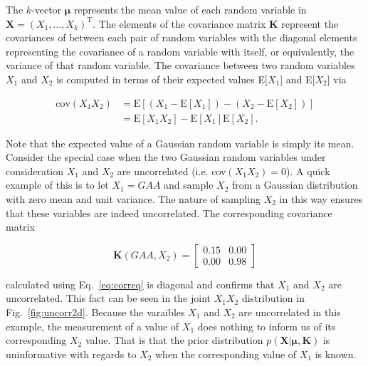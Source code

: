 \noindent The $k$-vector $\boldsymbol{\mu}$ represents the mean value of each
random variable in $\mathbf{X}=(X_1,\dots,X_k)^{\text{T}}$.
The elements of the covariance matrix
$\mathbf{K}$ represent the covariances of between each pair of random variables
with the diagonal elements representing the covariance of a random variable
with itself, or equivalently, the variance of that random variable.
The covariance between two random variables $X_1$ and $X_2$ is computed in terms
of their expected values E[$X_1$] and E[$X_2$] via

\begin{align}
  \text{cov}(X_1X_2) &= \text{E}[(X_1-\text{E}[X_1]) - (X_2-\text{E}[X_2])] \\
  &= \text{E}[X_1X_2] - \text{E}[X_1]\text{E}[X_2].
  \label{eq:coveq}
\end{align}

\noindent Note that the expected value of a Gaussian random variable is simply
its mean. \\

Consider the special case when the two Gaussian random variables under
consideration $X_1$ and $X_2$ are uncorrelated (i.e. cov$(X_1X_2)=0$). A quick
example of this is to let $X_1=GAA$ and sample $X_2$ from a Gaussian distribution
with zero mean and unit variance. The nature of sampling $X_2$ in this way ensures
that these variables are indeed uncorrelated. The corresponding covariance matrix

\begin{equation}
  \mathbf{K}(GAA,X_2) =
  \begin{bmatrix}
    0.15 & 0.00 \\
    0.00 & 0.98
  \end{bmatrix}
  \label{eq:Kuncorr}
\end{equation}

\noindent calculated using Eq.~\ref{eq:correq} is diagonal and confirms that
$X_1$ and $X_2$ are uncorrelated. This fact can be seen in the joint $X_1X_2$
distribution in Fig.~\ref{fig:uncorr2d}.
Because the varaibles $X_1$ and $X_2$ are uncorrelated in this example, the
measurement of a value of $X_1$ does nothing to inform us of its corresponding
$X_2$ value. That is that the prior distribution
$p(\mathbf{X}|\boldsymbol{\mu},\mathbf{K})$ is uninformative with regards to
$X_2$ when the corresponding value of $X_1$ is known. \\

